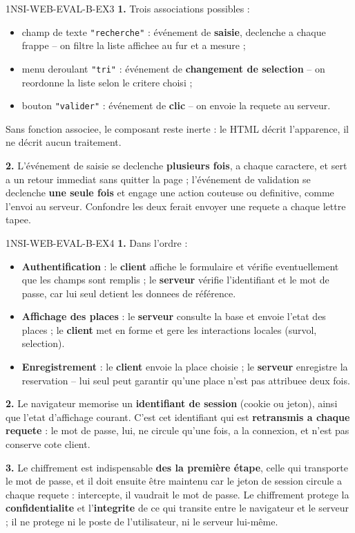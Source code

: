 \begin{corrige}{1NSI-WEB-EVAL-B-EX3}
\textbf{1.} Trois associations possibles :
\begin{itemize}
  \item champ de texte \lstinline{"recherche"} : événement de \textbf{saisie}, declenche a
  chaque frappe -- on filtre la liste affichee au fur et a mesure ;
  \item menu deroulant \lstinline{"tri"} : événement de \textbf{changement de selection} --
  on reordonne la liste selon le critere choisi ;
  \item bouton \lstinline{"valider"} : événement de \textbf{clic} -- on envoie la requete au
  serveur.
\end{itemize}
Sans fonction associee, le composant reste inerte : le HTML décrit l'apparence, il ne décrit
aucun traitement.

\textbf{2.} L'événement de saisie se declenche \textbf{plusieurs fois}, a chaque caractere,
et sert a un retour immediat sans quitter la page ; l'événement de validation se declenche
\textbf{une seule fois} et engage une action couteuse ou definitive, comme l'envoi au
serveur. Confondre les deux ferait envoyer une requete a chaque lettre tapee.
\end{corrige}

\begin{corrige}{1NSI-WEB-EVAL-B-EX4}
\textbf{1.} Dans l'ordre :
\begin{itemize}
  \item \textbf{Authentification} : le \textbf{client} affiche le formulaire et vérifie
  eventuellement que les champs sont remplis ; le \textbf{serveur} vérifie l'identifiant et
  le mot de passe, car lui seul detient les donnees de référence.
  \item \textbf{Affichage des places} : le \textbf{serveur} consulte la base et envoie
  l'etat des places ; le \textbf{client} met en forme et gere les interactions locales
  (survol, selection).
  \item \textbf{Enregistrement} : le \textbf{client} envoie la place choisie ; le
  \textbf{serveur} enregistre la reservation -- lui seul peut garantir qu'une place n'est pas
  attribuee deux fois.
\end{itemize}

\textbf{2.} Le navigateur memorise un \textbf{identifiant de session} (cookie ou jeton),
ainsi que l'etat d'affichage courant. C'est cet identifiant qui est \textbf{retransmis a
chaque requete} : le mot de passe, lui, ne circule qu'une fois, a la connexion, et n'est pas
conserve cote client.

\textbf{3.} Le chiffrement est indispensable \textbf{des la première étape}, celle qui
transporte le mot de passe, et il doit ensuite être maintenu car le jeton de session
circule a chaque requete : intercepte, il vaudrait le mot de passe. Le chiffrement protege
la \textbf{confidentialite} et l'\textbf{integrite} de ce qui transite entre le navigateur
et le serveur ; il ne protege ni le poste de l'utilisateur, ni le serveur lui-même.
\end{corrige}
